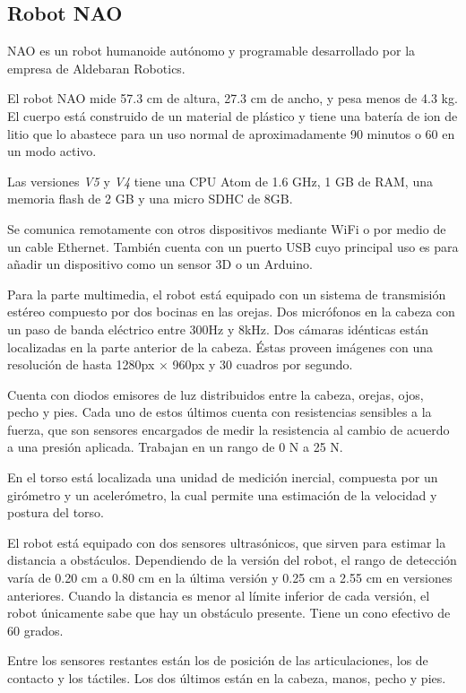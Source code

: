 

\subsection{Robot NAO}
NAO es un robot humanoide autónomo y programable desarrollado por la empresa de
Aldebaran Robotics.

El robot NAO mide 57.3 cm de altura, 27.3 cm de ancho, y pesa menos de 4.3 kg.
El cuerpo está construido de un material de plástico y tiene una batería de ion
de litio que lo abastece para un uso normal de aproximadamente
90 minutos o 60 en un modo activo.

Las versiones \textit{V5} y \textit{V4} tiene una CPU Atom de 1.6 GHz, 1 GB de RAM, una
memoria flash de 2 GB y una micro SDHC de 8GB.

Se comunica remotamente con otros dispositivos mediante WiFi o por medio de un
cable Ethernet. También cuenta con un puerto USB cuyo principal uso es para
añadir un dispositivo como un sensor 3D o un Arduino.

Para la parte multimedia, el robot está equipado con un sistema de transmisión
estéreo compuesto por dos bocinas en las orejas. Dos micrófonos en la cabeza
con un paso de banda eléctrico entre 300Hz y 8kHz. Dos cámaras idénticas están
localizadas en la parte anterior de la cabeza. Éstas proveen imágenes con una
resolución de hasta 1280px $\times$ 960px y 30 cuadros por segundo.

Cuenta con diodos emisores de luz distribuidos entre la cabeza, orejas, ojos, pecho y pies. Cada
uno de estos últimos cuenta con resistencias sensibles a la fuerza, que son
sensores encargados de medir la resistencia al cambio de acuerdo a una presión
aplicada. Trabajan en un rango de 0 N a 25 N.

En el torso está localizada una unidad de medición inercial, compuesta por un
girómetro y un acelerómetro, la cual permite una estimación de la velocidad
y postura del torso.

El robot está equipado con dos sensores ultrasónicos, que sirven para estimar
la distancia a obstáculos. Dependiendo de la versión del robot, el rango de
detección varía de 0.20 cm a 0.80 cm en la última versión y 0.25 cm a 2.55 cm
en versiones anteriores. Cuando la distancia es menor al límite inferior de
cada versión, el robot únicamente sabe que hay un obstáculo presente.
Tiene un cono efectivo de 60 grados.

Entre los sensores restantes están los de posición de las articulaciones, los
de contacto y los táctiles. Los dos últimos están en la cabeza, manos, pecho y
pies.

